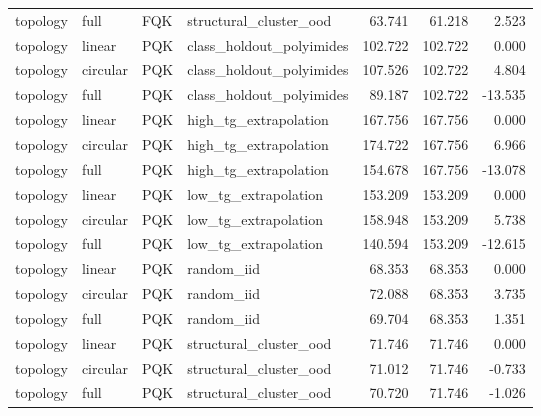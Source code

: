 \begin{tabular}{llllrrr}
topology & full & FQK & structural\_cluster\_ood & 63.741 & 61.218 & 2.523 \\
topology & linear & PQK & class\_holdout\_polyimides & 102.722 & 102.722 & 0.000 \\
topology & circular & PQK & class\_holdout\_polyimides & 107.526 & 102.722 & 4.804 \\
topology & full & PQK & class\_holdout\_polyimides & 89.187 & 102.722 & -13.535 \\
topology & linear & PQK & high\_tg\_extrapolation & 167.756 & 167.756 & 0.000 \\
topology & circular & PQK & high\_tg\_extrapolation & 174.722 & 167.756 & 6.966 \\
topology & full & PQK & high\_tg\_extrapolation & 154.678 & 167.756 & -13.078 \\
topology & linear & PQK & low\_tg\_extrapolation & 153.209 & 153.209 & 0.000 \\
topology & circular & PQK & low\_tg\_extrapolation & 158.948 & 153.209 & 5.738 \\
topology & full & PQK & low\_tg\_extrapolation & 140.594 & 153.209 & -12.615 \\
topology & linear & PQK & random\_iid & 68.353 & 68.353 & 0.000 \\
topology & circular & PQK & random\_iid & 72.088 & 68.353 & 3.735 \\
topology & full & PQK & random\_iid & 69.704 & 68.353 & 1.351 \\
topology & linear & PQK & structural\_cluster\_ood & 71.746 & 71.746 & 0.000 \\
topology & circular & PQK & structural\_cluster\_ood & 71.012 & 71.746 & -0.733 \\
topology & full & PQK & structural\_cluster\_ood & 70.720 & 71.746 & -1.026 \\
\bottomrule
\end{tabular}
